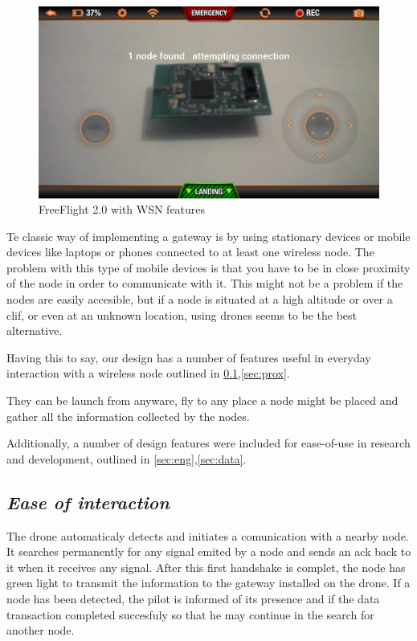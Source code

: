 \label{chap:arch}

\begin{figure}[ht] \centering
\includegraphics[width=1\textwidth]{img/app.png}
\caption{FreeFlight 2.0 with WSN features } \end{figure}

Te classic way of implementing a gateway is by using stationary devices or mobile devices like laptops or phones connected to at least one wireless node. The problem with this type of mobile devices is that you have to be in close proximity of the node in order to communicate with it. This might not be a problem if the nodes are easily accesible, but if a node is situated at a high altitude or over a clif, or even at an unknown location, using drones seems to be the best alternative.

Having this to say, our design has a number of features useful in everyday interaction with a wireless node outlined in \ref{sec:inter},\ref{sec:prox}. 

They can be launch from anyware, fly to any place a node might be placed and gather all the information collected by the nodes.

Additionally, a number of design features were included for ease-of-use in
research and development, outlined in \ref{sec:eng},\ref{sec:data}.


\subsection{\textit{Ease of interaction}} 

\label{sec:inter}

The drone automaticaly detects and initiates a comunication with a nearby node. It searches permanently for any signal emited by a node and sends an ack back to it when it receives any signal. After this first handshake is complet, the node has green light to transmit the information to the gateway installed on the drone. If a node has been detected, the pilot is informed of its presence and if the data transaction completed succesfuly so that he may continue in the search for another node.

